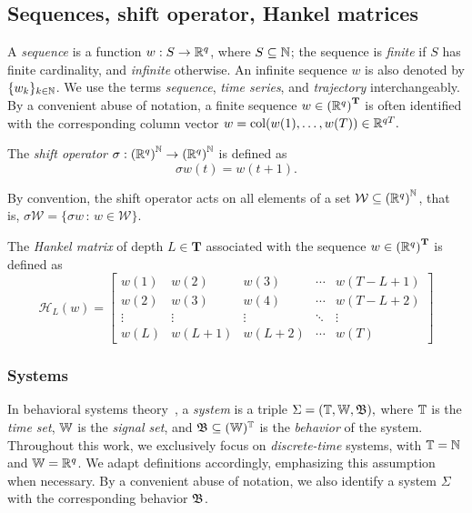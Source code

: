 \subsection{Sequences, shift operator, Hankel matrices}

 A \textit{sequence} is a function ${w: S \to \mathbb{R}^q}$, where ${S \subseteq \mathbb{N}}$; the sequence is \textit{finite} if $S$ has finite cardinality, and \textit{infinite} otherwise. An infinite sequence ${w}$ is also denoted by $\{w_k\}_{k\in\mathbb{N}}$. We use the terms \textit{sequence}, \textit{time series}, and \textit{trajectory} interchangeably.  By a convenient abuse of notation, a finite sequence ${w\in(\mathbb{R}^q)}^\mathbf{T}$ is often identified with the corresponding column vector ${w=\operatorname{col}(w(1),\ldots,w(T))\in\mathbb{R}^{qT}}.$

The \textit{shift operator} ${\sigma : {(\mathbb{R}^q)}^{\mathbb{N}} \to {(\mathbb{R}^q)}^{\mathbb{N}}}$ is defined as
 \begin{equation}
    \sigma w (t)= w(t+1).
 \end{equation}

 By convention, the shift operator acts on all elements of a set ${\mathcal{W} \subseteq {(\mathbb{R}^q)}^{\mathbb{N}}}$, that is, $\sigma \mathcal{W}  =\{\sigma w\,:\, w\in\mathcal{W} \}$.

The \textit{Hankel matrix} of depth ${L\in\mathbf{T}}$ associated with the sequence ${w\in {(\mathbb{R}^q)}^\mathbf{T}}$ is defined as 
 \begin{equation} \label{eq:Hankel} 
 \mathcal{H}_{L}(w) =
 \begin{bmatrix}
    w(1) & w(2) & w(3) & \cdots & w(T-L+1) \\
    w(2) & w(3) & w(4) & \cdots & w(T-L+2) \\
    \vdots & \vdots & \vdots & \ddots & \vdots \\
    w(L) & w(L+1) & w(L+2) & \cdots & w(T)
 \end{bmatrix}
 \end{equation}

 \subsubsection{Systems}
 In behavioral systems theory~\cite{willemspolderman1998}, a \textit{system} is a triple $\Sigma=(\mathbb{T},\mathbb{W},\mathfrak{B}),$ where $\mathbb{T}$ is the \textit{time set}, $\mathbb{W}$ is the \textit{signal set}, and $\mathfrak{B} \subseteq (\mathbb{W})^{\mathbb{T}}$ is the \textit{behavior} of the system. Throughout this work, we exclusively focus on \textit{discrete-time} systems, with ${\mathbb{T} = \mathbb{N}}$ and ${\mathbb{W} = \mathbb{R}^q}$. We adapt definitions accordingly, emphasizing this assumption when necessary. By a convenient abuse of notation, we also identify a system $\Sigma$ with the corresponding behavior $\mathfrak{B}$.

